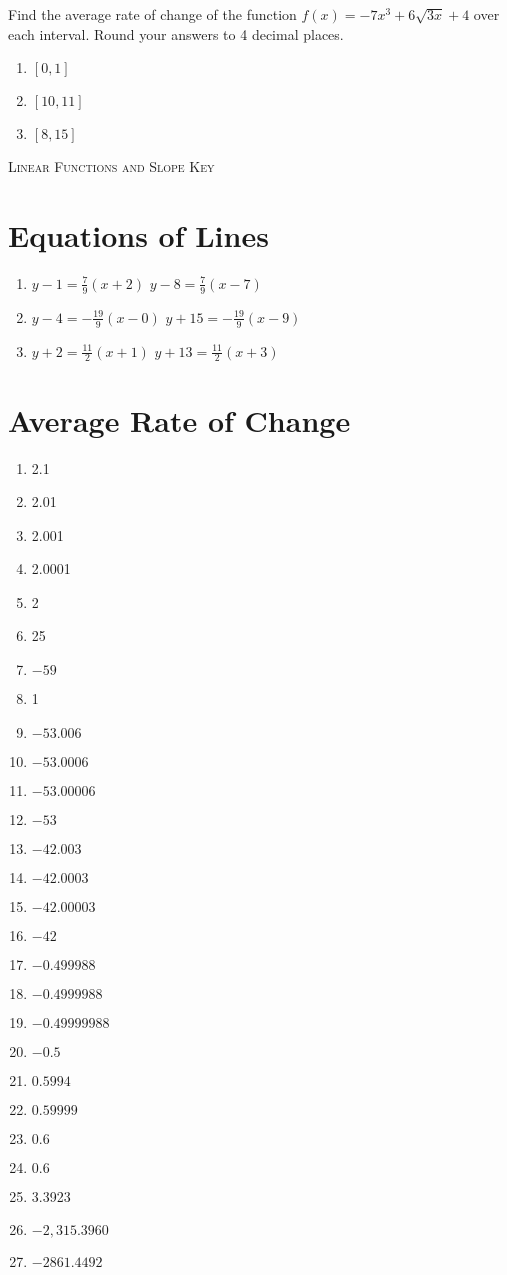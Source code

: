 Find the average rate of change of the function $f(x) = -7x^3 + 6\sqrt{3x} + 4$ over each interval. Round your answers to 4 decimal places.
\begin{enumerate}	\setcounter{enumi}{\value{Review}}
	\item $[0,1]$
	\item $[10,11]$
	\item $[8,15]$
\end{enumerate}	\setcounter{Review}{\value{enumi}}

\newpage

\textsc{Linear Functions and Slope Key}

\section*{Equations of Lines}
\begin{enumerate}
\item $y-1 = \frac{7}{9}(x+2)$  $y-8=\frac{7}{9}(x-7)$
    \item $y-4 = -\frac{19}{9}(x-0)$  $y+15=-\frac{19}{9}(x-9)$
    \item $y+2 = \frac{11}{2}(x+1)$  $y+13=\frac{11}{2}(x+3)$
\end{enumerate}

\section*{Average Rate of Change}
\begin{multicols}{3}
\begin{enumerate}
\item 2.1
\item 2.01
\item 2.001
\item 2.0001
\item 2
\item 25
\item $-59$
\item 1
\item $-53.006$
\item $-53.0006$
\item $-53.00006$
\item $-53$
\item $-42.003$
\item $-42.0003$
\item $-42.00003$
\item $-42$
\item $-0.499988$
\item $-0.4999988$
\item $-0.49999988$
\item $-0.5$
\item $0.5994$
\item $0.59999$
\item $0.6$
\item $0.6$
\item 3.3923
\item $-2,315.3960$
\item $-2861.4492$
\end{enumerate}
\end{multicols}